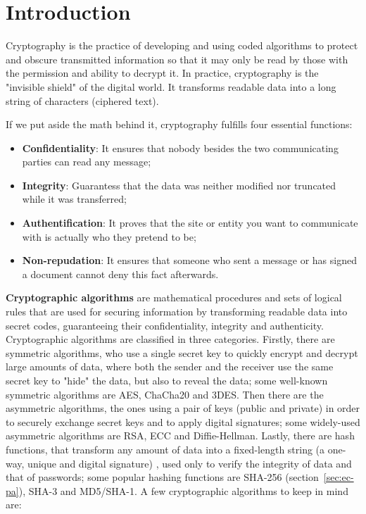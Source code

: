 \documentclass[12pt, a4paper]{article}
\begin{document}
\newpage
\tableofcontents
\thispagestyle{plain}

\newpage
\section{Introduction}
\label{sec:introduction}


Cryptography is the practice of developing and using coded algorithms to protect and obscure transmitted information so that it may only be read by those with the permission and ability to decrypt it. In practice, cryptography is the "invisible shield" of the digital world. It transforms readable data into a long string of characters (ciphered text). 

If we put aside the math behind it, cryptography fulfills four essential functions:

\begin{itemize}
  \item \textbf{Confidentiality}: It ensures that nobody besides the two communicating parties can read any message;
  \item \textbf{Integrity}: Guarantess that the data was neither modified nor truncated while it was transferred;
  \item \textbf{Authentification}: It proves that the site or entity you want to communicate with is actually who they pretend to be;
  \item \textbf{Non-repudation}: It ensures that someone who sent a message or has signed a document cannot deny this fact afterwards.
\end{itemize}

\textbf{Cryptographic algorithms} are mathematical procedures and sets of logical rules that are used for securing information by transforming readable data into secret codes, guaranteeing their confidentiality, integrity and authenticity.
Cryptographic algorithms are classified in three categories. Firstly, there are symmetric algorithms, who use a single secret key to quickly encrypt and decrypt large amounts of data, where both the sender and the receiver use the same secret key to "hide" the data, but also to reveal the data; some well-known symmetric algorithms are AES, ChaCha20 and 3DES. Then there are the asymmetric algorithms, the ones using a pair of keys (public and private) in order to securely exchange secret keys and to apply digital signatures; some widely-used asymmetric algorithms are RSA, ECC and Diffie-Hellman. Lastly, there are hash functions, that transform any amount of data into a fixed-length string (a one-way, unique and digital signature) , used only to verify the integrity of data and that of passwords; some popular hashing functions are SHA-256 (section~\ref{sec:ec-pa}), SHA-3 and MD5/SHA-1. A few cryptographic algorithms to keep in mind are:
\end{document}
